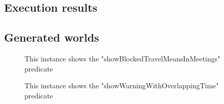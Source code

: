 \documentclass[12pt,titlepage]{article}
\begin{document}
\subsection{Execution results}\label{sec:mod1}
\begin{figure}[h]
\end{figure}
\clearpage

\begin{landscape}
\newpage
\subsection{Generated worlds}\label{sec:mod1}
\begin{figure}[h]
\caption{This instance shows the "showBlockedTravelMeansInMeetings" predicate}
\end{figure}
\clearpage
\end{landscape}

\begin{landscape}
\newpage
\begin{figure}[h]
\caption{This instance shows the "showWarningWithOverlappingTime" predicate}
\end{figure}
\clearpage
\end{landscape}
\end{document}
